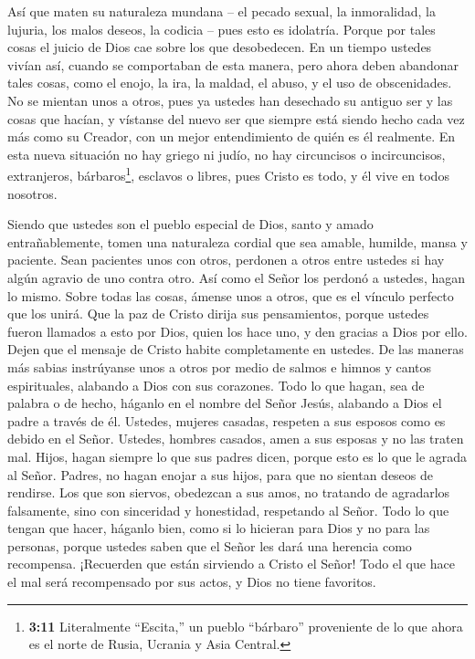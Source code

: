  Así que maten su naturaleza mundana -- el pecado sexual, la
inmoralidad, la lujuria, los malos deseos, la codicia -- pues esto es
idolatría.  Porque por tales cosas el juicio de Dios cae
sobre los que desobedecen.  En un tiempo ustedes vivían así,
cuando se comportaban de esta manera,  pero ahora deben
abandonar tales cosas, como el enojo, la ira, la maldad, el abuso, y el
uso de obscenidades.  No se mientan unos a otros, pues ya
ustedes han desechado su antiguo ser y las cosas que hacían,
 y vístanse del nuevo ser que siempre está siendo hecho
cada vez más como su Creador, con un mejor entendimiento de quién es él
realmente.  En esta nueva situación no hay griego ni judío,
no hay circuncisos o incircuncisos, extranjeros, bárbaros\footnote{\textbf{3:11}
  Literalmente ``Escita,'' un pueblo ``bárbaro'' proveniente de lo que
  ahora es el norte de Rusia, Ucrania y Asia Central.}, esclavos o
libres, pues Cristo es todo, y él vive en todos nosotros.

 Siendo que ustedes son el pueblo especial de Dios, santo y
amado entrañablemente, tomen una naturaleza cordial que sea amable,
humilde, mansa y paciente.  Sean pacientes unos con otros,
perdonen a otros entre ustedes si hay algún agravio de uno contra otro.
Así como el Señor los perdonó a ustedes, hagan lo mismo. 
Sobre todas las cosas, ámense unos a otros, que es el vínculo perfecto
que los unirá.  Que la paz de Cristo dirija sus
pensamientos, porque ustedes fueron llamados a esto por Dios, quien los
hace uno, y den gracias a Dios por ello.  Dejen que el
mensaje de Cristo habite completamente en ustedes. De las maneras más
sabias instrúyanse unos a otros por medio de salmos e himnos y cantos
espirituales, alabando a Dios con sus corazones.  Todo lo
que hagan, sea de palabra o de hecho, háganlo en el nombre del Señor
Jesús, alabando a Dios el padre a través de él.  Ustedes,
mujeres casadas, respeten a sus esposos como es debido en el Señor.
 Ustedes, hombres casados, amen a sus esposas y no las
traten mal.  Hijos, hagan siempre lo que sus padres dicen,
porque esto es lo que le agrada al Señor.  Padres, no hagan
enojar a sus hijos, para que no sientan deseos de rendirse.
 Los que son siervos, obedezcan a sus amos, no tratando de
agradarlos falsamente, sino con sinceridad y honestidad, respetando al
Señor.  Todo lo que tengan que hacer, háganlo bien, como si
lo hicieran para Dios y no para las personas,  porque
ustedes saben que el Señor les dará una herencia como recompensa.
¡Recuerden que están sirviendo a Cristo el Señor!  Todo el
que hace el mal será recompensado por sus actos, y Dios no tiene
favoritos.

